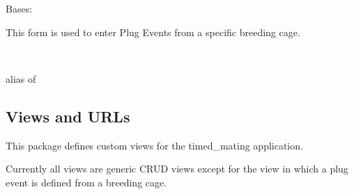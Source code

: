 \documentclass[letterpaper,10pt,english]{sphinxmanual}
\begin{document}
\begin{fulllineitems}
\label{api:timed_mating.forms.BreedingPlugForm}
Bases: 

This form is used to enter Plug Events from a specific breeding cage.

\begin{fulllineitems}
\label{api:timed_mating.forms.BreedingPlugForm.Meta}~

\begin{fulllineitems}
\label{api:timed_mating.forms.BreedingPlugForm.Meta.model}
alias of 

\end{fulllineitems}


\end{fulllineitems}


\begin{fulllineitems}
\label{api:timed_mating.forms.BreedingPlugForm.media}
\end{fulllineitems}


\end{fulllineitems}



\subsection{Views and URLs}
\label{api:id7}\label{api:module-timed_mating.views}
This package defines custom views for the timed\_mating application.

Currently all views are generic CRUD views except for the view in which a plug event is defined from a breeding cage.
\end{document}
